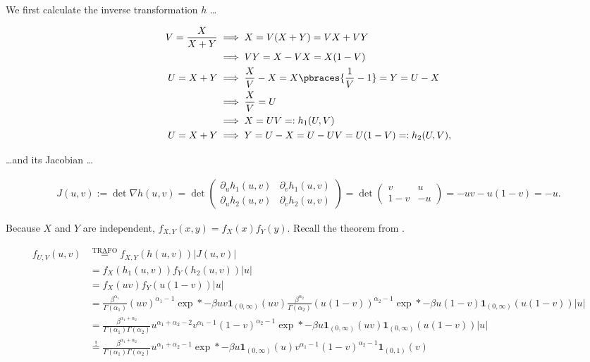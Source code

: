 \begin{solution}

We first calculate the inverse transformation $h$ \dots

\begin{align*}
    V = \frac{X}{X + Y}
    & \implies
    X = V (X + Y) = V X + V Y \\
    & \implies
    V Y = X - V X = X (1 - V ) \\
    U = X + Y
    & \implies
    \frac{X}{V} - X = X \pbraces{\frac{1}{V} - 1} = Y = U - X \\
    & \implies
    \frac{X}{V} = U \\
    & \implies
    X = U V =: h_1(U, V) \\
    U = X + Y
    & \implies
    Y = U - X = U - U V = U (1 - V) =: h_2(U, V),
\end{align*}

\dots and its Jacobian \dots

\begin{align*}
    J(u, v)
    :=
    \det \nabla h(u, v)
    =
    \det
    \begin{pmatrix}
        \partial_u h_1(u, v) & \partial_v h_1(u, v) \\
        \partial_u h_2(u, v) & \partial_v h_2(u, v)
    \end{pmatrix}
    =
    \det
    \begin{pmatrix}
            v &  u \\
        1 - v & -u
    \end{pmatrix}
    =
    -u v - u (1 - v)
    =
    -u.
\end{align*}

Because $X$ and $Y$ are independent, $f_{X, Y}(x, y) = f_X(x) f_Y(y)$.
Recall the theorem from \cite[Lecture 3, Slide 32]{EStat}.

\begin{align*}
    f_{U, V}(u, v)
    & \stackrel
    {
        \text{TRAFO}
    }{=}
    f_{X, Y}(h(u, v)) |J(u, v)| \\
    & =
    f_X(h_1(u, v)) f_Y(h_2(u, v)) |u| \\
    & =
    f_X(u v) f_Y(u (1 - v)) |u| \\
    & =
    \frac{\beta^{\alpha_1}}{\Gamma(\alpha_1)} (u v)      ^{\alpha_1 - 1} \exp*{-\beta u v}       \mathbf 1_{(0, \infty)}(u v)
    \frac{\beta^{\alpha_2}}{\Gamma(\alpha_2)} (u (1 - v))^{\alpha_2 - 1} \exp*{-\beta u (1 - v)} \mathbf 1_{(0, \infty)}(u (1 - v))
    |u| \\
    & =
    \frac{\beta^{\alpha_1 + \alpha_2}}{\Gamma(\alpha_1) \Gamma(\alpha_2)}
    u^{\alpha_1 + \alpha_2 - 2}
    v^{\alpha_1 - 1} (1 - v)^{\alpha_2 - 1}
    \exp*{-\beta u}
    \mathbf 1_{(0, \infty)}(u v)
    \mathbf 1_{(0, \infty)}(u (1 - v))
    |u| \\
    & \stackrel{!}{=}
    \frac{\beta^{\alpha_1 + \alpha_2}}{\Gamma(\alpha_1) \Gamma(\alpha_2)}
    u^{\alpha_1 + \alpha_2 - 1}
    \exp*{-\beta u}
    \mathbf 1_{(0, \infty)}(u)
    v^{\alpha_1 - 1} (1 - v)^{\alpha_2 - 1}
    \mathbf 1_{(0, 1)}(v)
\end{align*}


\end{solution}
